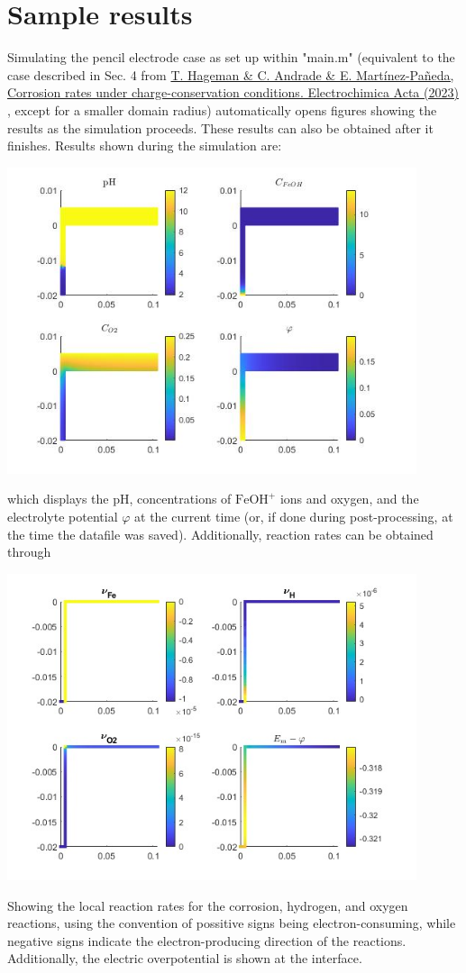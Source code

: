 \documentclass[3p]{elsarticle} %
\newcommand{\citeMe}{\href{https://doi.org/10.1016/j.electacta.2023.142624}{T. Hageman \& C. Andrade \& E. Martínez-Pañeda, Corrosion rates under charge-conservation conditions. Electrochimica Acta (2023)} \citep{Hageman2023}}
\begin{document}
\section{Sample results}
Simulating the pencil electrode case as set up within "main.m" (equivalent to the case described in Sec. 4 from \citeMe{}, except for a smaller domain radius) automatically opens figures showing the results as the simulation proceeds. These results can also be obtained after it finishes. Results shown during the simulation are:

\begin{center}
\includegraphics[width=12cm]{../Figures/Surfs.jpg}
\end{center}
which displays the pH, concentrations of $\mathrm{FeOH}^+$ ions and oxygen, and the electrolyte potential $\varphi$ at the current time (or, if done during post-processing, at the time the datafile was saved). Additionally, reaction rates can be obtained through

\begin{center}
\includegraphics[width=12cm]{../Figures/Rates.jpg}
\end{center}
Showing the local reaction rates for the corrosion, hydrogen, and oxygen reactions, using the convention of possitive signs being electron-consuming, while negative signs indicate the electron-producing direction of the reactions. Additionally, the electric overpotential is shown at the interface.
\end{document}
